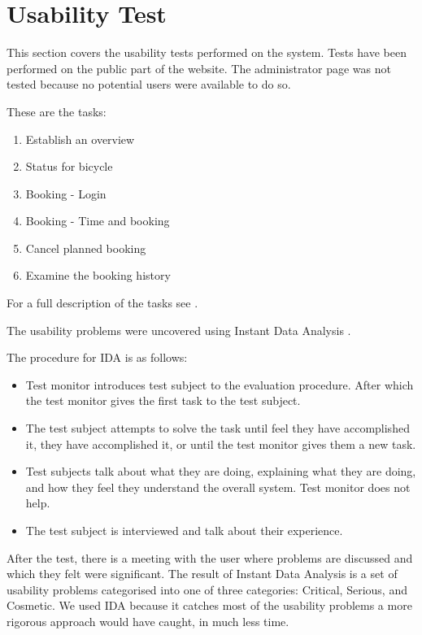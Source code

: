 \section{Usability Test}
This section covers the usability tests performed on the system.
Tests have been performed on the public part of the website.
The administrator page was not tested because no potential users were available to do so.

These are the tasks:

\begin{enumerate}
\item Establish an overview
\item Status for bicycle
\item Booking - Login
\item Booking - Time and booking
\item Cancel planned booking
\item Examine the booking history
\end{enumerate}
For a full description of the tasks see .

The usability problems were uncovered using Instant Data Analysis \citep{misc:usabilitytest}.

The procedure for IDA is as follows:

\begin{itemize}
\item Test monitor introduces test subject to the evaluation procedure. After which the test monitor gives the first task to the test subject.
\item The test subject attempts to solve the task until feel they have accomplished it, they have accomplished it, or until the test monitor gives them a new task.
\item Test subjects talk about what they are doing, explaining what they are doing, and how they feel they understand the overall system. Test monitor does not help.
\item The test subject is interviewed and talk about their experience.
\end{itemize}

After the test, there is a meeting with the user where problems are discussed and which they felt were significant.
The result of Instant Data Analysis is a set of usability problems categorised into one of three categories: Critical, Serious, and Cosmetic.
We used IDA because it catches most of the usability problems a more rigorous approach would have caught, in much less time.

